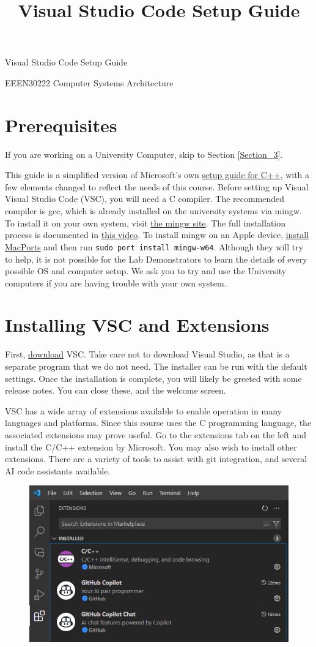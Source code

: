 \documentclass{article}
\title{Visual Studio Code Setup Guide}
\newcommand{\code}[1]{\colorbox{codegrey}{\lstinline|#1|}}
\begin{document}
\centering
\Large Visual Studio Code Setup Guide\par
\large EEEN30222 Computer Systems Architecture

\normalsize\raggedright
\section{Prerequisites}

If you are working on a University Computer, skip to Section \ref{Section_3}.


This guide is a simplified version of Microsoft's own \href{https://code.visualstudio.com/docs/cpp/config-mingw}{setup guide for C++}, with a few elements changed to reflect the needs of this course. 
Before setting up Visual Visual Studio Code (VSC), you will need a C compiler. The recommended compiler is gcc, which is already installed on the university systems via mingw. To install it on your own system, visit \href{https://www.mingw-w64.org/}{the mingw site}. The full installation process is documented in \href{https://www.youtube.com/watch?v=oC69vlWofJQ}{this video}. To install mingw on an Apple device, \href{https://www.macports.org/install.php}{install MacPorts} and then run \code{sudo port install mingw-w64}. Although they will try to help, it is not possible for the Lab Demonstrators to learn the details of every possible OS and computer setup. We ask you to try and use the University computers if you are having trouble with your own system. 

\section{Installing VSC and Extensions}
First, \href{https://code.visualstudio.com/download}{download} VSC. Take care not to download Visual Studio, as that is a separate program that we do not need. The installer can be run with the default settings. Once the installation is complete, you will likely be greeted with some release notes. You can close these, and the welcome screen. \par
VSC has a wide array of extensions available to enable operation in many languages and platforms. Since this course uses the C programming language, the associated extensions may prove useful. 
Go to the extensions tab on the left and install the C/C++ extension by Microsoft. You may also wish to install other extensions. There are a variety of tools to assist with git integration, and several AI code assistants available.
\begin{figure}[h]
    \centering
    \includegraphics[width=0.5\linewidth]{extensions.png}
    \label{fig:enter-label}
\end{figure}
\end{document}
